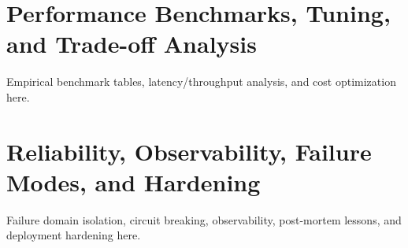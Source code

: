 \documentclass[11pt,oneside]{book}
\begin{document}
\chapter{Performance Benchmarks, Tuning, and Trade-off Analysis}
\label{ch:performance}
Empirical benchmark tables, latency/throughput analysis, and cost optimization here.

\chapter{Reliability, Observability, Failure Modes, and Hardening}
\label{ch:reliability}
Failure domain isolation, circuit breaking, observability, post-mortem lessons, and deployment hardening here.

\backmatter




\end{document}
